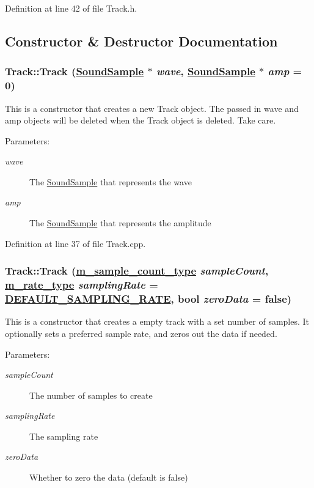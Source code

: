 Definition at line 42 of file Track.h.

\subsection{Constructor \& Destructor Documentation}
\hypertarget{classTrack_a0}{
\subsubsection[Track]{\setlength{\rightskip}{0pt plus 5cm}Track::Track (\hyperlink{classSoundSample}{Sound\-Sample} $\ast$ {\em wave}, \hyperlink{classSoundSample}{Sound\-Sample} $\ast$ {\em amp} = 0)}}
\label{classTrack_a0}


This is a constructor that creates a new Track object. The passed in wave and amp objects will be deleted when the Track object is deleted. Take care. \begin{Desc}
\item[Parameters:]
\begin{description}
\item[{\em wave}]The \hyperlink{classSoundSample}{Sound\-Sample} that represents the wave \item[{\em amp}]The \hyperlink{classSoundSample}{Sound\-Sample} that represents the amplitude \end{description}
\end{Desc}


Definition at line 37 of file Track.cpp.\hypertarget{classTrack_a1}{
\subsubsection[Track]{\setlength{\rightskip}{0pt plus 5cm}Track::Track (\hyperlink{Types_8h_a1}{m\_\-sample\_\-count\_\-type} {\em sample\-Count}, \hyperlink{Types_8h_a4}{m\_\-rate\_\-type} {\em sampling\-Rate} = \hyperlink{Types_8h_a5}{DEFAULT\_\-SAMPLING\_\-RATE}, bool {\em zero\-Data} = false)}}
\label{classTrack_a1}


This is a constructor that creates a empty track with a set number of samples. It optionally sets a preferred sample rate, and zeros out the data if needed. \begin{Desc}
\item[Parameters:]
\begin{description}
\item[{\em sample\-Count}]The number of samples to create \item[{\em sampling\-Rate}]The sampling rate \item[{\em zero\-Data}]Whether to zero the data (default is false) \end{description}
\end{Desc}


